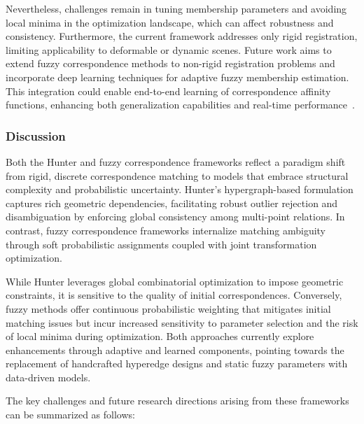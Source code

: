 \documentclass[sigconf]{acmart}
\begin{document}
Nevertheless, challenges remain in tuning membership parameters and avoiding local minima in the optimization landscape, which can affect robustness and consistency. Furthermore, the current framework addresses only rigid registration, limiting applicability to deformable or dynamic scenes. Future work aims to extend fuzzy correspondence methods to non-rigid registration problems and incorporate deep learning techniques for adaptive fuzzy membership estimation. This integration could enable end-to-end learning of correspondence affinity functions, enhancing both generalization capabilities and real-time performance~\cite{ref5}.

\subsubsection{Discussion}

Both the Hunter and fuzzy correspondence frameworks reflect a paradigm shift from rigid, discrete correspondence matching to models that embrace structural complexity and probabilistic uncertainty. Hunter’s hypergraph-based formulation captures rich geometric dependencies, facilitating robust outlier rejection and disambiguation by enforcing global consistency among multi-point relations. In contrast, fuzzy correspondence frameworks internalize matching ambiguity through soft probabilistic assignments coupled with joint transformation optimization.

While Hunter leverages global combinatorial optimization to impose geometric constraints, it is sensitive to the quality of initial correspondences. Conversely, fuzzy methods offer continuous probabilistic weighting that mitigates initial matching issues but incur increased sensitivity to parameter selection and the risk of local minima during optimization. Both approaches currently explore enhancements through adaptive and learned components, pointing towards the replacement of handcrafted hyperedge designs and static fuzzy parameters with data-driven models.

The key challenges and future research directions arising from these frameworks can be summarized as follows:
\end{document}
